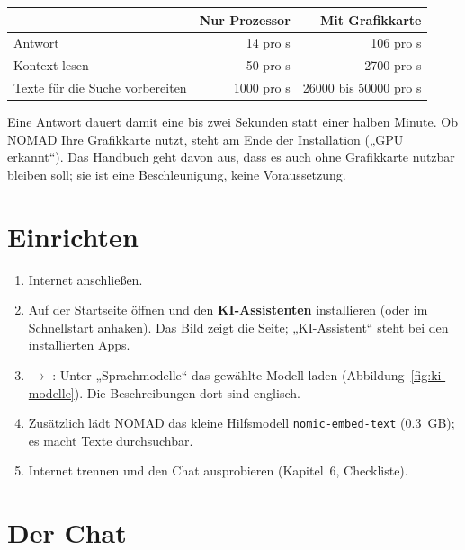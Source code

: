 \begin{center}\small
\renewcommand{\arraystretch}{1.3}
\begin{tabular}{@{}lrr@{}}
\toprule
 & \textbf{Nur Prozessor} & \textbf{Mit Grafikkarte} \\
\midrule
Antwort & 14 pro s & 106 pro s \\
Kontext lesen & 50 pro s & 2700 pro s \\
Texte für die Suche vorbereiten & 1000 pro s & 26000 bis 50000 pro s \\
\bottomrule
\end{tabular}
\end{center}
Eine Antwort dauert damit eine bis zwei Sekunden statt einer halben Minute. Ob NOMAD Ihre Grafikkarte nutzt, steht am Ende der Installation („GPU erkannt“). Das Handbuch geht davon aus, dass es auch ohne Grafikkarte nutzbar bleiben soll; sie ist eine Beschleunigung, keine Voraussetzung.

\section{Einrichten}
\begin{enumerate}[leftmargin=1.5em,itemsep=3pt]
\item Internet anschließen.
\item Auf der Startseite  öffnen und den \textbf{KI-Assistenten} installieren (oder im Schnellstart anhaken). Das Bild zeigt die Seite; „KI-Assistent“ steht bei den installierten Apps.
\item {} $\rightarrow$ : Unter „Sprachmodelle“ das gewählte Modell laden (Abbildung~\ref{fig:ki-modelle}). Die Beschreibungen dort sind englisch.
\item Zusätzlich lädt NOMAD das kleine Hilfsmodell \texttt{nomic-embed-text} (\SI{0,3}{GB}); es macht Texte durchsuchbar.
\item Internet trennen und den Chat ausprobieren (Kapitel~6, Checkliste).
\end{enumerate}

\label{fig:ki-modelle}

\section{Der Chat}
\label{fig:ki-antwort}

